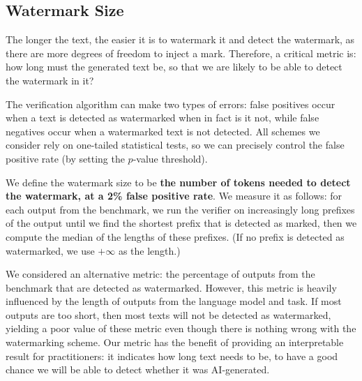 \subsection{Watermark Size}

The longer the text, the easier it is to watermark it and detect the watermark, as there are more degrees of freedom to inject a mark.
Therefore, a critical metric is: how long must the generated text be, so that we are likely to be able to detect the watermark in it?

The verification algorithm can make two types of errors: false positives occur when a text is detected as watermarked when in fact is it not, while false negatives occur when a watermarked text is not detected. 
%
All schemes we consider rely on one-tailed statistical tests, so we can precisely control the false positive rate (by setting the $p$-value threshold).

We define the watermark size to be \textbf{the number of tokens needed to detect the watermark, at a 2\% false positive rate}.
%
We measure it as follows: for each output
from the benchmark, we run the verifier on increasingly long prefixes of
the output until we find the shortest prefix that is detected as marked,
then we compute the median of the lengths of these prefixes.
(If no prefix is detected as watermarked, we use $+\infty$ as the length.)

%

We considered an alternative metric: the percentage of outputs
from the benchmark that are detected as watermarked.
However, this metric is heavily influenced by the length of outputs
from the language model and task.
If most outputs are too short, then most texts will not be detected
as watermarked, yielding a poor value of these metric even though
there is nothing wrong with the watermarking scheme.
Our metric has the benefit of providing an interpretable result
for practitioners: it indicates how long text needs to be, to have
a good chance we will be able to detect whether it was AI-generated.

